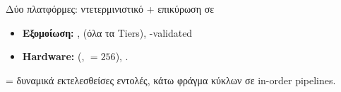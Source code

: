 \begin{frame}{Δύο πλατφόρμες: ντετερμινιστικό \instret + επικύρωση σε }
  \begin{itemize}
    \item \textbf{Εξομοίωση:} ,  (όλα τα Tiers), -validated
    \item \textbf{Hardware:}  (, \VLEN${}=256$), .
  \end{itemize}
  \vfill
  \begin{center}\footnotesize
    \instret = δυναμικά εκτελεσθείσες εντολές, κάτω φράγμα κύκλων σε in-order pipelines.
  \end{center}
\end{frame}
